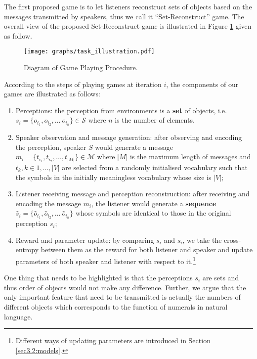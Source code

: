  The first proposed game is to let listeners reconstruct sets of objects based on the messages transmitted by speakers, thus we call it ``Set-Reconstruct'' game. The overall view of the proposed Set-Reconstruct game is illustrated in Figure \ref{fig2:game_procedure} given as follow.

\begin{figure}[!h]
  \centering
  \texttt{[image: graphs/task\_illustration.pdf]}
  \caption{Diagram of Game Playing Procedure.}
  \label{fig2:game_procedure}
\end{figure}

According to the steps of playing games at iteration $i$, the components of our games are illustrated as follows:
\begin{enumerate}
  \item Perceptions: the perception from environments is a \textbf{set} of objects, i.e. $s_i=\{o_{i_1}, o_{i_2}, \dots\ o_{i_n}\} \in \mathcal{S}$ where $n$ is the number of elements.
  \item Speaker observation and message generation: after observing and encoding the perception, speaker $S$ would generate a message $m_i=\{t_{i_1}, t_{i_2}, \dots, t_{|M|}\} \in \mathcal{M}$ where $|M|$ is the maximum length of messages and $t_k, k \in {1, \dots, |V|}$ are selected from a randomly initialised vocabulary such that the symbols in the initially meaningless vocabulary whose size is $|V|$;
  \item Listener receiving message and perception reconstruction: after receiving and encoding the message $m_i$, the listener would generate a \textbf{sequence} $\hat{s}_i = \{\hat{o}_{i_1}, \hat{o}_{i_2}, \dots\ \hat{o}_{i_n}\}$ whose symbols are identical to those in the original perception $s_i$;
  \item Reward and parameter update: by comparing $s_i$ and $\hat{s}_i$, we take the cross-entropy between them as the reward for both listener and speaker and update parameters of both speaker and listener with respect to it.\footnote{Different ways of updating parameters are introduced in Section \ref{sec3.2:models}.}
\end{enumerate}

One thing that needs to be highlighted is that the perceptions $s_i$ are sets and thus order of objects would not make any difference. Further, we argue that the only important feature that need to be transmitted is actually the numbers of different objects which corresponds to the function of numerals in natural language.


